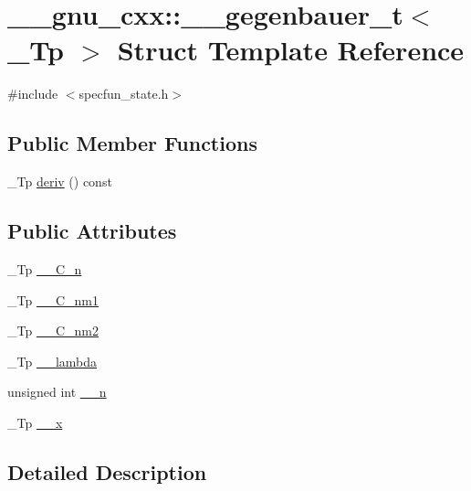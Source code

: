 \hypertarget{struct____gnu__cxx_1_1____gegenbauer__t}{}\section{\+\_\+\+\_\+gnu\+\_\+cxx\+:\+:\+\_\+\+\_\+gegenbauer\+\_\+t$<$ \+\_\+\+Tp $>$ Struct Template Reference}
\label{struct____gnu__cxx_1_1____gegenbauer__t}


{\ttfamily \#include $<$specfun\+\_\+state.\+h$>$}

\subsection*{Public Member Functions}
\begin{DoxyCompactItemize}
\item 
\+\_\+\+Tp \hyperlink{struct____gnu__cxx_1_1____gegenbauer__t_a7f67b4bddba90569373b9a7b67492f08}{deriv} () const
\end{DoxyCompactItemize}
\subsection*{Public Attributes}
\begin{DoxyCompactItemize}
\item 
\+\_\+\+Tp \hyperlink{struct____gnu__cxx_1_1____gegenbauer__t_a84d400a2aa985534a294c1b4c4dedd40}{\+\_\+\+\_\+\+C\+\_\+n}
\item 
\+\_\+\+Tp \hyperlink{struct____gnu__cxx_1_1____gegenbauer__t_a25439e9a062a73760358397e89555ac4}{\+\_\+\+\_\+\+C\+\_\+nm1}
\item 
\+\_\+\+Tp \hyperlink{struct____gnu__cxx_1_1____gegenbauer__t_aa987c8e0fc387d8624b58dbed25e2f68}{\+\_\+\+\_\+\+C\+\_\+nm2}
\item 
\+\_\+\+Tp \hyperlink{struct____gnu__cxx_1_1____gegenbauer__t_a1c91798ec415bb7ff9ae1b9f036a80c3}{\+\_\+\+\_\+lambda}
\item 
unsigned int \hyperlink{struct____gnu__cxx_1_1____gegenbauer__t_a5dde8f1dd18526fa426eac86209d97cc}{\+\_\+\+\_\+n}
\item 
\+\_\+\+Tp \hyperlink{struct____gnu__cxx_1_1____gegenbauer__t_a937c707f32f6c438db733b911b4f0bdf}{\+\_\+\+\_\+x}
\end{DoxyCompactItemize}


\subsection{Detailed Description}
